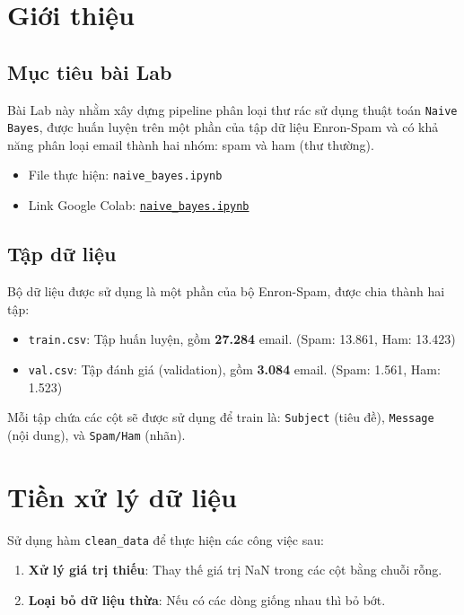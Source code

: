\section{Giới thiệu}

\subsection{Mục tiêu bài Lab}
Bài Lab này nhằm xây dựng pipeline phân loại thư rác sử dụng thuật toán \texttt{Naive Bayes}, được huấn luyện trên một phần của tập dữ liệu Enron-Spam và có khả năng phân loại email thành hai nhóm: spam và ham (thư thường).
\begin{itemize}
    \item File thực hiện: \texttt{naive\_bayes.ipynb}
    \item Link Google Colab: \href{https://colab.research.google.com/drive/1ak1tem0BahBoTphuWsCrY9-QLOd2sJru?usp=sharing}{\texttt{naive\_bayes.ipynb}}
\end{itemize}

\subsection{Tập dữ liệu}
Bộ dữ liệu được sử dụng là một phần của bộ Enron-Spam, được chia thành hai tập:
\begin{itemize}
    \item \texttt{train.csv}: Tập huấn luyện, gồm \textbf{27.284} email. (Spam: 13.861, Ham: 13.423)
    \item \texttt{val.csv}: Tập đánh giá (validation), gồm \textbf{3.084} email. (Spam: 1.561, Ham: 1.523)
\end{itemize}
Mỗi tập chứa các cột sẽ được sử dụng để train là: \texttt{Subject} (tiêu đề), \texttt{Message} (nội dung), và \texttt{Spam/Ham} (nhãn).

\section{Tiền xử lý dữ liệu} \label{preprocess}
Sử dụng hàm \texttt{clean\_data} để thực hiện các công việc sau:
\begin{enumerate}
    \item \textbf{Xử lý giá trị thiếu}: Thay thế giá trị NaN trong các cột bằng chuỗi rỗng.
    \item \textbf{Loại bỏ dữ liệu thừa}: Nếu có các dòng giống nhau thì bỏ bớt.
\end{enumerate}

